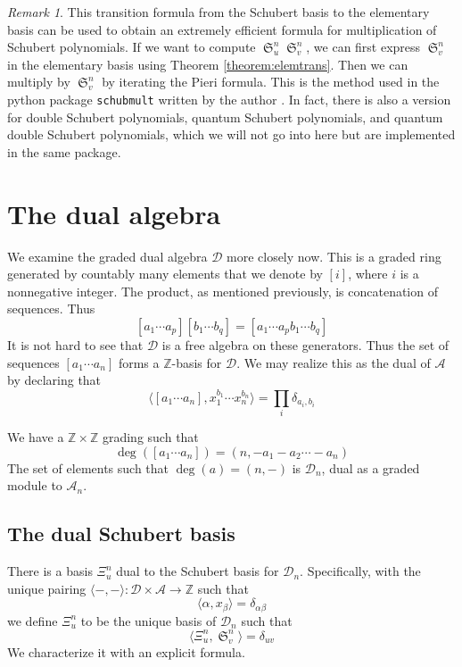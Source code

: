 \documentclass{amsart}
\theoremstyle{definition}
\theoremstyle{remark}
\newtheorem*{remark}{Remark}
\numberwithin{equation}{subsection}
\DeclareMathOperator{\sch}{\mathfrak{S}}
\newcommand{\dsch}{\ensuremath{\Xi}}
\newcommand{\coma}{\mathcal{A}}
\newcommand{\dcoma}{\mathcal{D}}
\begin{document}
\begin{remark}
This transition formula from the Schubert basis to the elementary basis can be used to obtain an extremely efficient formula for multiplication of Schubert polynomials. If we want to compute $\sch_u^n\sch_v^n$, we can first express $\sch_v^n$ in the elementary basis using Theorem \ref{theorem:elemtrans}. Then we can multiply by $\sch_v^n$ by iterating the Pieri formula. This is the method used in the python package \verb|schubmult| written by the author \cite{schubmult}. In fact, there is also a version for double Schubert polynomials, quantum Schubert polynomials, and quantum double Schubert polynomials, which we will not go into here but are implemented in the same package.
\end{remark}




\section{The dual algebra}\label{section:dualalgebra}

We examine the graded dual algebra $\dcoma$ more closely now. This is a graded ring generated by countably many elements that we denote by $[i]$, where $i$ is a nonnegative integer. The product, as mentioned previously, is concatenation of sequences. Thus
$$[a_1\cdots a_p][b_1\cdots b_q]=[a_1\cdots a_pb_1\cdots b_q]$$
It is not hard to see that $\dcoma$ is a free algebra on these generators. Thus the set of sequences $[a_1\cdots a_n]$ forms a $\mathbb{Z}$-basis for $\dcoma$. We may realize this as the dual of $\coma$ by declaring that
$$\langle [a_1\cdots a_n],x_1^{b_1}\cdots x_n^{b_n}\rangle = \prod_i\delta_{a_i,b_i}$$

We have a $\mathbb{Z}\times \mathbb{Z}$ grading such that
$$\deg([a_1\cdots a_n])=(n,-a_1-a_2\cdots-a_n)$$
The set of elements such that $\deg(a) = (n,-)$ is $\dcoma_n$, dual as a graded module to $\coma_n$.

\subsection{The dual Schubert basis}
       
There is a basis $\dsch_u^{n}$ dual to the Schubert basis for $\dcoma_n$. Specifically, with the unique pairing $\langle -,-\rangle:\dcoma\times \coma\to\mathbb{Z}$ such that
$$\langle \alpha,x_\beta\rangle = \delta_{\alpha\beta}$$
we define $\dsch_u^n$ to be the unique basis of $\dcoma_n$ such that
$$\langle \dsch_u^n,\sch_v^n\rangle = \delta_{uv}$$
We characterize it with an explicit formula.
\end{document}
